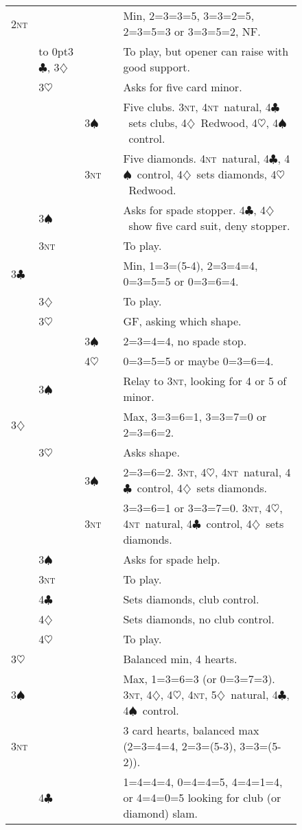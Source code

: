 \documentclass{report}
\renewcommand{\c}{\ensuremath{\clubsuit}}
\renewcommand{\d}{\ensuremath{\diamondsuit}}
\newcommand{\h}{\ensuremath{\heartsuit}}
\newcommand{\s}{\ensuremath{\spadesuit}}
\newcommand{\nt}{\textsc{nt}}
\newcommand{\+}{\ensuremath{^+}}
\begin{document}
\begin{figure}[ht]
\begin{tabular}{ll|ll|l}
 2\nt & & & & Min, 2=3=3=5, 3=3=2=5, 2=3=5=3 or 3=3=5=2, NF. \\
 & \hbox to 0pt{3\c, 3\d} & & & To play, but opener can raise with good support. \\
 & 3\h & & & Asks for five card minor. \\
 & & 3\s & & Five clubs. 3\nt, 4\nt\ natural, 4\c\ sets clubs, 4\d\ Redwood, 4\h, 4\s\ control.\\\
 & & 3\nt & & Five diamonds. 4\nt\ natural, 4\c, 4\s\ control, 4\d\ sets diamonds, 4\h\ Redwood.\\
 & 3\s & & & Asks for spade stopper. 4\c, 4\d\ show five card suit, deny stopper.\\
 & 3\nt & & & To play. \\
 3\c & & & & Min, 1=3=(5-4), 2=3=4=4, 0=3=5=5 or 0=3=6=4. \\
 & 3\d & & & To play. \\
 & 3\h & & & GF, asking which shape. \\
 & & 3\s & & 2=3=4=4, no spade stop. \\
 & & 4\h & & 0=3=5=5 or maybe 0=3=6=4. \\
 & 3\s & & & Relay to 3\nt, looking for 4 or 5 of minor. \\
 3\d & & & & Max, 3=3=6=1, 3=3=7=0 or 2=3=6=2. \\
 & 3\h & & & Asks shape. \\
 & & 3\s & & 2=3=6=2. 3\nt, 4\h, 4\nt\ natural, 4\c\ control, 4\d\ sets diamonds.\\
 & & 3\nt & & 3=3=6=1 or 3=3=7=0. 3\nt, 4\h, 4\nt\ natural, 4\c\ control, 4\d\ sets diamonds.\\
 & 3\s & & & Asks for spade help. \\
 & 3\nt & & & To play. \\
 & 4\c & & & Sets diamonds, club control. \\
 & 4\d & & & Sets diamonds, no club control.\\
 & 4\h & & & To play. \\
 3\h & & & & Balanced min, 4 hearts.\\
 3\s & & & & Max, 1=3=6=3 (or 0=3=7=3). 3\nt, 4\d, 4\h, 4\nt, 5\d\ natural, 4\c, 4\s\ control.\\
 3\nt & & & & 3 card hearts, balanced max (2=3=4=4, 2=3=(5-3), 3=3=(5-2)). \\
 & 4\c & & & 1=4=4=4, 0=4=4=5, 4=4=1=4, or 4=4=0=5 looking for club (or diamond) slam. \\

\end{tabular}
\end{figure}
\end{document}
